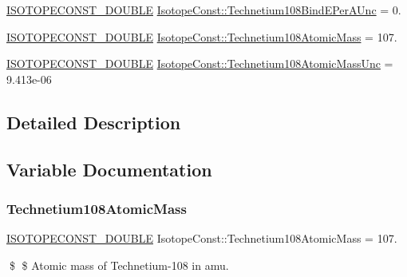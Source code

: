 \begin{DoxyCompactItemize}
\item 
\mbox{\hyperlink{group___isotope_const-_macros_ga8f45a7272ce02c0b4c65c44636ed719a}{I\+S\+O\+T\+O\+P\+E\+C\+O\+N\+S\+T\+\_\+\+D\+O\+U\+B\+LE}} \mbox{\hyperlink{group___isotope_const-_technetium-_tc108_ga20fc208932e7bf6c18698190a980150d}{Isotope\+Const\+::\+Technetium108\+Bind\+E\+Per\+A\+Unc}} = 0.
\item 
\mbox{\hyperlink{group___isotope_const-_macros_ga8f45a7272ce02c0b4c65c44636ed719a}{I\+S\+O\+T\+O\+P\+E\+C\+O\+N\+S\+T\+\_\+\+D\+O\+U\+B\+LE}} \mbox{\hyperlink{group___isotope_const-_technetium-_tc108_gaab6bffdfa26d2819cfc1e3e24f3e4f7e}{Isotope\+Const\+::\+Technetium108\+Atomic\+Mass}} = 107.
\item 
\mbox{\hyperlink{group___isotope_const-_macros_ga8f45a7272ce02c0b4c65c44636ed719a}{I\+S\+O\+T\+O\+P\+E\+C\+O\+N\+S\+T\+\_\+\+D\+O\+U\+B\+LE}} \mbox{\hyperlink{group___isotope_const-_technetium-_tc108_ga7c7b8612f642b520d42c018571c5a4d4}{Isotope\+Const\+::\+Technetium108\+Atomic\+Mass\+Unc}} = 9.\+413e-\/06
\end{DoxyCompactItemize}


\subsection{Detailed Description}


\subsection{Variable Documentation}
\mbox{\label{group___isotope_const-_technetium-_tc108_gaab6bffdfa26d2819cfc1e3e24f3e4f7e}} 
\subsubsection{\texorpdfstring{Technetium108\+Atomic\+Mass}{Technetium108AtomicMass}}
{\footnotesize\ttfamily \mbox{\hyperlink{group___isotope_const-_macros_ga8f45a7272ce02c0b4c65c44636ed719a}{I\+S\+O\+T\+O\+P\+E\+C\+O\+N\+S\+T\+\_\+\+D\+O\+U\+B\+LE}} Isotope\+Const\+::\+Technetium108\+Atomic\+Mass = 107.}

\$ \$ Atomic mass of Technetium-\/108 in amu. \mbox{\label{group___isotope_const-_technetium-_tc108_ga7c7b8612f642b520d42c018571c5a4d4}} 
